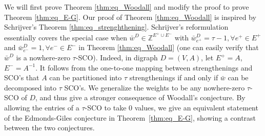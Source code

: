 \documentclass[runningheads]{llncs}
\newcommand{\Z}{\mathbb{Z}}
\begin{document}
We will first prove Theorem \ref{thm:eq_Woodall} and modify the proof to prove Theorem \ref{thm:eq_E-G}. Our proof of Theorem \ref{thm:eq_Woodall} is inspired by Schrijver's Theorem \ref{thm:eq_strenghthening}. Schrijver's reformulation essentially covers the special case when $\bar{w}^D\in\Z^{E^+\cup E^-}$ with $\bar{w}^D_{e^+}=\tau-1,\forall e^+\in E^+$ and $\bar{w}^D_{e^-}=1,\forall e^-\in E^-$ in Theorem \ref{thm:eq_Woodall} (one can easily verify that $\bar{w}^D$ is a nowhere-zero $\tau$-SCO). Indeed, in  digraph $D=(V,A)$, let $E^+=A$, $E^-=A^{-1}$. It follows from the one-to-one mapping between strengthenings and SCO's that $A$ can be partitioned into $\tau$ strengthenings if and only if $\bar{w}$ can be decomposed into $\tau$ SCO's.  We generalize the weights to be any nowhere-zero $\tau$-SCO of $D$, and thus give a stronger consequence of Woodall's conjecture. By allowing the entries of a $\tau$-SCO to take $0$ values, we give an equivalent statement of the Edmonds-Giles conjecture in Theorem~\ref{thm:eq_E-G}, showing a contrast between the two conjectures.
\end{document}
